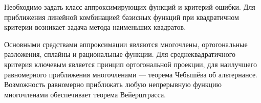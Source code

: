 Необходимо задать класс аппроксимирующих функций и критерий ошибки. Для приближения линейной комбинацией базисных функций при квадратичном критерии возникает задача метода наименьших квадратов.

Основными средствами аппроксимации являются многочлены, ортогональные разложения,
сплайны и рациональные функции. Для среднеквадратичного критерия ключевым является
принцип ортогональной проекции, для наилучшего равномерного приближения
многочленами --- теорема Чебышёва об альтернансе. Возможность равномерно
приближать любую непрерывную функцию многочленами обеспечивает теорема
Вейерштрасса.

\newpage
